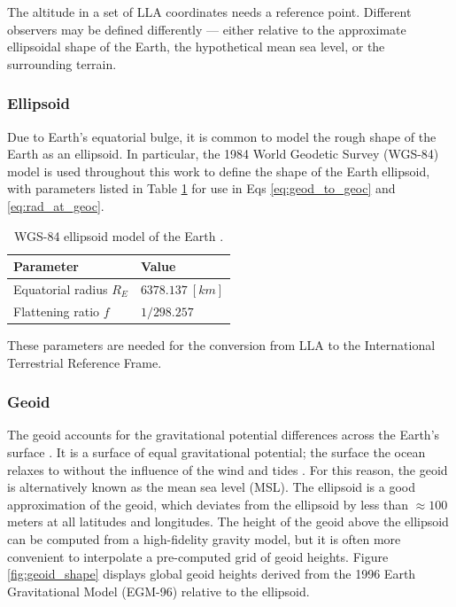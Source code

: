 The altitude in a set of LLA coordinates needs a reference point. Different observers may be defined differently --- either relative to the approximate ellipsoidal shape of the Earth, the hypothetical mean sea level, or the surrounding terrain.

\subsubsection{Ellipsoid}

Due to Earth's equatorial bulge, it is common to model the rough shape of the Earth as an ellipsoid. In particular, the 1984 World Geodetic Survey (WGS-84) model is used throughout this work to define the shape of the Earth ellipsoid, with parameters listed in Table \ref{tb:wgs84} for use in Eqs \ref{eq:geod_to_geoc} and \ref{eq:rad_at_geoc}.

\begin{table}[ht]
  \centering
  \caption{WGS-84 ellipsoid model of the Earth \cite{vallado4ed}.}
  \vspace*{6pt}
  \begin{tabular}{|l|l|}
  \hline
  \textbf{Parameter} & \textbf{Value}              \\ \hline
  Equatorial radius $R_E$             & $6378.137 \: [km]$ \\ \hline
  Flattening ratio $f$                & $1 / 298.257$      \\ \hline
  \end{tabular}
  \label{tb:wgs84}
\end{table}

These parameters are needed for the conversion from LLA to the International Terrestrial Reference Frame.

\subsubsection{Geoid}

The geoid accounts for the gravitational potential differences across the Earth's surface \cite{vallado4ed}. It is a surface of equal gravitational potential; the surface the ocean relaxes to without the influence of the wind and tides \cite{vallado4ed}. For this reason, the geoid is alternatively known as the mean sea level (MSL). The ellipsoid is a good approximation of the geoid, which deviates from the ellipsoid by less than $\approx 100$ meters at all latitudes and longitudes. The height of the geoid above the ellipsoid can be computed from a high-fidelity gravity model, but it is often more convenient to interpolate a pre-computed grid of geoid heights. Figure \ref{fig:geoid_shape} displays global geoid heights derived from the 1996 Earth Gravitational Model (EGM-96) relative to the ellipsoid.

